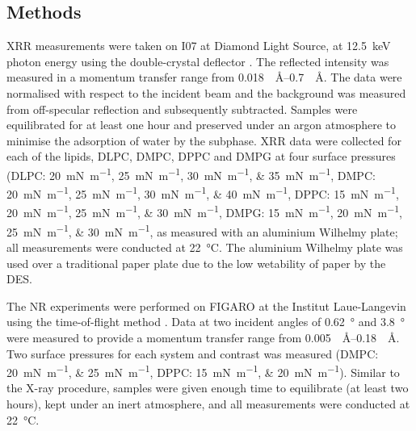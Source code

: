 \documentclass[amsmath,amssymb,twocolumn,superscriptaddress]{revtex4-1}
\begin{document}
\subsection{Methods}
%
XRR measurements were taken on I07 at Diamond Light Source, at \SI{12.5}{\kilo\electronvolt} photon energy using the double-crystal deflector \cite{Arnold2012}.
The reflected intensity was measured in a momentum transfer range from \SIrange{0.018}{0.7}{\per\angstrom}.
The data were normalised with respect to the incident beam and the background was measured from off-specular reflection and subsequently subtracted.
Samples were equilibrated for at least one hour and preserved under an argon atmosphere to minimise the adsorption of water by the subphase.
XRR data were collected for each of the lipids, DLPC, DMPC, DPPC and DMPG at four surface pressures (DLPC: \SIlist[list-units = single]{20;25;30;35}{\milli\newton\per\meter}, DMPC: \SIlist[list-units = single]{20;25;30;40}{\milli\newton\per\meter}, DPPC: \SIlist[list-units = single]{15;20;25;30}{\milli\newton\per\meter}, DMPG: \SIlist[list-units = single]{15;20;25;30}{\milli\newton\per\meter}, as measured with an aluminium Wilhelmy plate; all measurements were conducted at \SI{22}{\celsius}.
The aluminium Wilhelmy plate was used over a traditional paper plate due to the low wetability of paper by the DES.

The NR experiments were performed on FIGARO at the Institut Laue-Langevin using the time-of-flight method \cite{Campbell2011}.
Data at two incident angles of \SI{0.62}{\degree} and \SI{3.8}{\degree} were measured to provide a momentum transfer range from \SIrange{0.005}{0.18}{\per\angstrom}.
Two surface pressures for each system and contrast was measured (DMPC: \SIlist[list-units = single]{20;25}{\milli\newton\per\meter}, DPPC: \SIlist[list-units = single]{15;20}{\milli\newton\per\meter}).
Similar to the X-ray procedure, samples were given enough time to equilibrate (at least two hours), kept under an inert atmosphere, and all measurements were conducted at \SI{22}{\celsius}.
\end{document}
